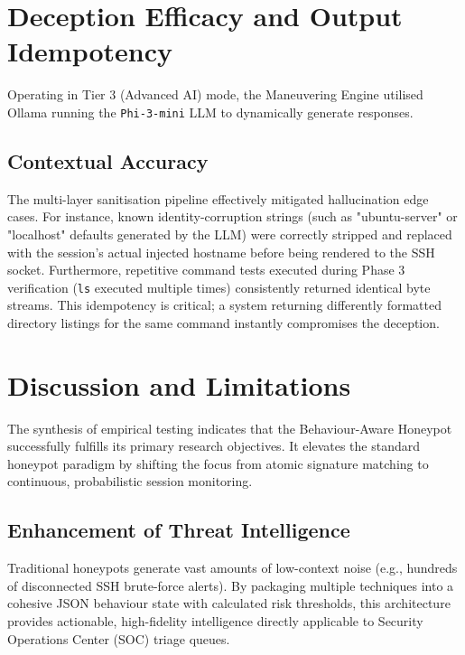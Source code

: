 \section{Deception Efficacy and Output Idempotency}

Operating in Tier 3 (Advanced AI) mode, the Maneuvering Engine utilised Ollama running the \texttt{Phi-3-mini} LLM to dynamically generate responses. 

\subsection{Contextual Accuracy}
The multi-layer sanitisation pipeline effectively mitigated hallucination edge cases. For instance, known identity-corruption strings (such as "ubuntu-server" or "localhost" defaults generated by the LLM) were correctly stripped and replaced with the session's actual injected hostname before being rendered to the SSH socket. 
Furthermore, repetitive command tests executed during Phase 3 verification (\texttt{ls} executed multiple times) consistently returned identical byte streams. This idempotency is critical; a system returning differently formatted directory listings for the same command instantly compromises the deception.

\section{Discussion and Limitations}

The synthesis of empirical testing indicates that the Behaviour-Aware Honeypot successfully fulfills its primary research objectives. It elevates the standard honeypot paradigm by shifting the focus from atomic signature matching to continuous, probabilistic session monitoring.

\subsection{Enhancement of Threat Intelligence}
Traditional honeypots generate vast amounts of low-context noise (e.g., hundreds of disconnected SSH brute-force alerts). By packaging multiple techniques into a cohesive JSON behaviour state with calculated risk thresholds, this architecture provides actionable, high-fidelity intelligence directly applicable to Security Operations Center (SOC) triage queues.

